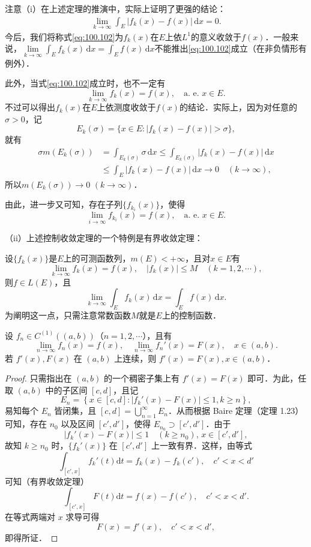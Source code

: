 \documentclass[../../main.tex]{subfiles}
\begin{document}
\begin{remark}
注意（i）在上述定理的推演中，实际上证明了更强的结论：
\begin{align}
\lim_{k \to \infty} \int_E |f_k(x) - f(x)| \, \mathrm{d}x = 0. \label{eq:100.102}
\end{align}
今后，我们将称式\eqref{eq:100.102}为\(f_k(x)\)在\(E\)上依\(L^1\)的意义收敛于\(f(x)\)．一般来说，$\underset{k\rightarrow \infty}{\lim}\int_E{f_k(x)\,\mathrm{d}x}=\int_E{f(x)\,\mathrm{d}x}$不能推出\eqref{eq:100.102}成立（在非负情形有例外）．

此外，当式\eqref{eq:100.102}成立时，也不一定有
\[
\lim_{k \to \infty} f_k(x) = f(x), \quad \text{a. e. } x \in E.
\]
不过可以得出\(f_k(x)\)在\(E\)上依测度收敛于\(f(x)\)的结论．实际上，因为对任意的\(\sigma > 0\)，记
\[
E_k(\sigma) = \{ x \in E : |f_k(x) - f(x)| > \sigma \},
\]
就有
\begin{align*}
\sigma m(E_k(\sigma)) &= \int_{E_k(\sigma)} \sigma \, \mathrm{d}x \leqslant \int_{E_k(\sigma)} |f_k(x) - f(x)| \, \mathrm{d}x \\
&\leqslant \int_E |f_k(x) - f(x)| \, \mathrm{d}x \to 0 \quad (k \to \infty),
\end{align*}
所以\(m(E_k(\sigma)) \to 0\) \((k \to \infty)\)．

由此，进一步又可知，存在子列\(\{ f_{k_i}(x) \}\)，使得
\[
\lim_{i \to \infty} f_{k_i}(x) = f(x), \quad \text{a. e. } x \in E.
\]

（ii）上述控制收敛定理的一个特例是有界收敛定理：

设\(\{ f_k(x) \}\)是\(E\)上的可测函数列，\(m(E) < +\infty\)，且对\(x \in E\)有
\[
\lim_{k \to \infty} f_k(x) = f(x), \quad |f_k(x)| \leqslant M \quad (k = 1, 2, \cdots),
\]
则\(f \in L(E)\)，且
\[
\lim_{k \to \infty} \int_E f_k(x) \, \mathrm{d}x = \int_E f(x) \, \mathrm{d}x.
\]
为阐明这一点，只需注意常数函数\(M\)就是\(E\)上的控制函数．
\end{remark}

\begin{example}
设 \( f_n \in C^{(1)}((a,b)) \)（\( n = 1,2,\cdots \)），且有
\[
\lim_{n \to \infty} f_n(x) = f(x), \quad \lim_{n \to \infty} f_n'(x) = F(x), \quad x \in (a,b).
\]
若 \( f'(x), F(x) \) 在 \( (a,b) \) 上连续，则 \( f'(x) = F(x), x \in (a,b) \)．
\end{example}
\begin{proof}
只需指出在 \( (a,b) \) 的一个稠密子集上有 \( f'(x) = F(x) \) 即可．为此，任取 \( (a,b) \) 中的子区间 \( [c,d] \)，且记
\[
E_n = \left\{ x \in [c,d] : |f_k'(x) - F(x)| \leqslant 1, k \geqslant n \right\},
\]
易知每个 \( E_n \) 皆闭集，且 \( [c,d] = \bigcup_{n=1}^{\infty} E_n \)．从而根据 Baire 定理（定理 1.23）可知，存在 \( n_0 \) 以及区间 \( [c',d'] \)，使得 \( E_{n_0} \supset [c',d'] \)．由于
\[
|f_k'(x) - F(x)| \leqslant 1 \quad (k \geqslant n_0), \, x \in [c',d'],
\]
故知 \( k \geqslant n_0 \) 时，\( \{ f_k'(x) \} \) 在 \( [c',d'] \) 上一致有界．这样，由等式
\[
\int_{[c',x]} f_k'(t) \mathrm{d}t = f_k(x) - f_k(c'), \quad c' < x < d'
\]
可知（有界收敛定理）
\[
\int_{[c',x]} F(t) \mathrm{d}t = f(x) - f(c'), \quad c' < x < d'.
\]
在等式两端对 \( x \) 求导可得
\[
F(x) = f'(x), \quad c' < x < d',
\]
即得所证．

\end{proof}
\end{document}
